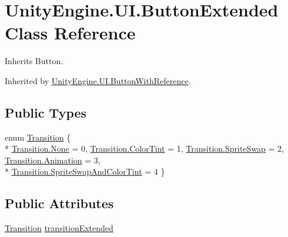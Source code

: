 \hypertarget{class_unity_engine_1_1_u_i_1_1_button_extended}{}\section{Unity\+Engine.\+U\+I.\+Button\+Extended Class Reference}
\label{class_unity_engine_1_1_u_i_1_1_button_extended}


Inherits Button.



Inherited by \hyperlink{class_unity_engine_1_1_u_i_1_1_button_with_reference}{Unity\+Engine.\+U\+I.\+Button\+With\+Reference}.

\subsection*{Public Types}
\begin{DoxyCompactItemize}
\item 
enum \hyperlink{class_unity_engine_1_1_u_i_1_1_button_extended_a736f90926c9b164b76e47cefbabc0798}{Transition} \{ \\*
\hyperlink{class_unity_engine_1_1_u_i_1_1_button_extended_a736f90926c9b164b76e47cefbabc0798a6adf97f83acf6453d4a6a4b1070f3754}{Transition.\+None} = 0, 
\hyperlink{class_unity_engine_1_1_u_i_1_1_button_extended_a736f90926c9b164b76e47cefbabc0798aac1fb22b4a4f9e7ea98c0ce09e5775d5}{Transition.\+Color\+Tint} = 1, 
\hyperlink{class_unity_engine_1_1_u_i_1_1_button_extended_a736f90926c9b164b76e47cefbabc0798a55f727b6dcbd9f95c90ac3af6c27c455}{Transition.\+Sprite\+Swap} = 2, 
\hyperlink{class_unity_engine_1_1_u_i_1_1_button_extended_a736f90926c9b164b76e47cefbabc0798ad6b6b668dbca9d4fe774bb654226ebe3}{Transition.\+Animation} = 3, 
\\*
\hyperlink{class_unity_engine_1_1_u_i_1_1_button_extended_a736f90926c9b164b76e47cefbabc0798abc332ad5e33df8c448aad95e84aeaadd}{Transition.\+Sprite\+Swap\+And\+Color\+Tint} = 4
 \}
\end{DoxyCompactItemize}
\subsection*{Public Attributes}
\begin{DoxyCompactItemize}
\item 
\hyperlink{class_unity_engine_1_1_u_i_1_1_button_extended_a736f90926c9b164b76e47cefbabc0798}{Transition} \hyperlink{class_unity_engine_1_1_u_i_1_1_button_extended_ac76b5b23d006c561763090fa2e25dcc9}{transition\+Extended}
\end{DoxyCompactItemize}
